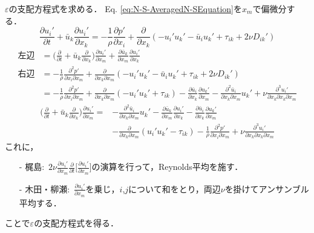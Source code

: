 \documentclass[12pt,a4paper]{jsarticle}
\begin{document}
$\varepsilon$の支配方程式を求める．
Eq. \ref{eq:N-S-AveragedN-SEquation}を$x_m$で偏微分する．
\begin{equation*}
  \frac{\partial u_i'}{\partial t} +\bar{u}_k \frac{\partial u_i'}{\partial x_k} = -\frac{1}{\rho} \frac{\partial p'}{\partial x_i} +\frac{\partial}{\partial x_k} (-u_i' u_k' -\bar{u}_i u_k' +\tau_{ik} +2 \nu D_{ik}') \tag{6.11}
\end{equation*}
\begin{align*}
  左辺 &= \Big( \frac{\partial}{\partial t} +\bar{u}_k \frac{\partial}{\partial x_k} \Big) \frac{\partial u_i'}{\partial x_m} + \frac{\partial \bar{u}_k}{\partial x_m} \frac{\partial u_i'}{\partial x_k} \\
  右辺 &= -\frac{1}{\rho} \frac{\partial^2 p'}{\partial x_i \partial x_m} +\frac{\partial}{\partial x_k \partial x_m} (-u_i' u_k' -\bar{u}_i u_k' +\tau_{ik} +2 \nu D_{ik}') \\
    &= -\frac{1}{\rho} \frac{\partial^2 p'}{\partial x_i \partial x_m} +\frac{\partial}{\partial x_k \partial x_m} (-u_i' u_k' +\tau_{ik}) -\frac{\partial \bar{u}_i}{\partial x_k} \frac{\partial u_k'}{\partial x_m} -\frac{\partial^2 \bar{u}_i}{\partial x_k \partial x_m} u_k' +\nu \frac{\partial^3 u_i'}{\partial x_k \partial x_k \partial x_m}
\end{align*}
\begin{align*}
  \Big( \frac{\partial}{\partial t} +\bar{u}_k \frac{\partial}{\partial x_k} \Big) \frac{\partial u_i'}{\partial x_m} = &-\frac{\partial^2 \bar{u}_i}{\partial x_k \partial x_m} u_k' -\frac{\partial \bar{u}_k}{\partial x_m} \frac{\partial u_i'}{\partial x_k} -\frac{\partial \bar{u}_i}{\partial x_k} \frac{\partial u_k'}{\partial x_m} \\
    &-\frac{\partial}{\partial x_k \partial x_m} (u_i' u_k' -\tau_{ik}) -\frac{1}{\rho} \frac{\partial^2 p'}{\partial x_i \partial x_m} +\nu \frac{\partial^3 u_i'}{\partial x_k \partial x_k \partial x_m}
\end{align*}
%
これに，
\begin{itemize}
  \item[-] 梶島\cite{Kajishima}:~$\displaystyle{2\nu \frac{\partial u_i'}{\partial x_m} \frac{\partial}{\partial t} \Big[ \frac{\partial u_i'}{\partial x_m} \Big] }$の演算を行って，Reynolds平均を施す．
  \item[-] 木田・柳瀬\cite{KidaYanase}:~$\displaystyle{\frac{\partial u_i'}{\partial x_m}}$を乗じ，$i$,$j$について和をとり，両辺$\nu$を掛けてアンサンブル平均する．
\end{itemize}
ことで$\varepsilon$の支配方程式を得る．\\
\end{document}
